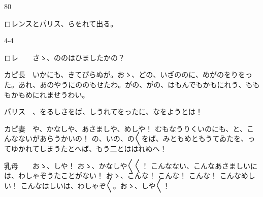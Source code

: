 \documentclass[tate,paper=b6j,jafontsize=9pt]{jlreq}
\begin{document}
\begin{azconvIndented}{8\zw}{0\zw}

ロレンスとパリス、らをれて出る。

\end{azconvIndented}
\begin{azconvIndented}{4\zw}{-4\zw}

ロレ　　さゝ、ののはひましたかの？

カピ長　いかにも、きてびらぬが。おゝ、どの、いざののに、めがのをりをった。あれ、あのやうにののもせたわ。がの、がの、はもんでもかもにれう、もももかもめにれませうわい。

パリス　、をるしさをば、しうれてをったに、なをようとは！

カピ妻　や、かなしや、あさましや、めしや！ むもなうりくいのにも、と、こんなないがあらうかいの！ の、いの、の{〳〵}をば、みともめともうてゐたを、ってゆかれてしまうたとへば、もう二とははれぬへ！

乳母　　おゝ、しや！ おゝ、かなしや{〳〵}{〳〵}！ こんなない、こんなあさましいには、わしゃぞうたことがない！ おゝ、こんな！ こんな！ こんな！ こんなめしい！ こんなはしいは、わしゃぞ{〳〵}。おゝ、しや{〳〵}！


\end{azconvIndented}
\end{document}
